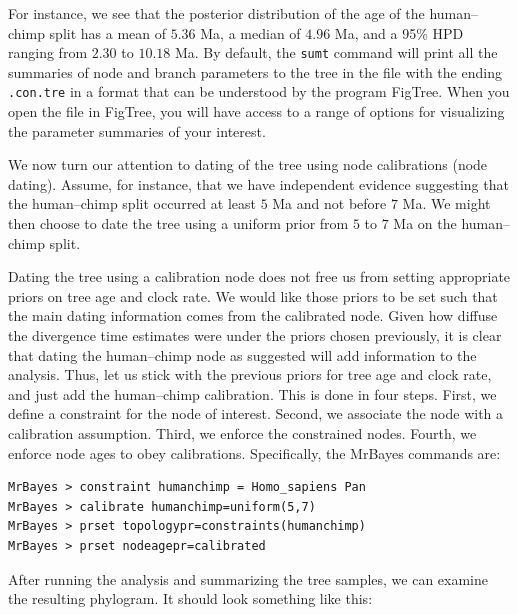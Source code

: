 \documentclass[12pt]{book}
\begin{document}
For instance, we see that the posterior distribution of the age of the human--chimp split has a
mean of $5.36$ Ma, a median of $4.96$ Ma, and a 95\% HPD ranging from $2.30$ to $10.18$ Ma. By
default, the \texttt{sumt} command will print all the summaries of node and branch parameters to
the tree in the file with the ending \texttt{.con.tre} in a format that can be understood by the
program FigTree.  When you open the file in FigTree, you will have access to a range of options for
visualizing the parameter summaries of your interest.

We now turn our attention to dating of the tree using node calibrations (node dating). Assume, for
instance, that we have independent evidence suggesting that the human--chimp split occurred at
least $5$ Ma and not before $7$ Ma. We might then choose to date the tree using a uniform prior
from $5$ to $7$ Ma on the human--chimp split.

Dating the tree using a calibration node does not free us from setting appropriate priors on tree
age and clock rate. We would like those priors to be set such that the main dating information
comes from the calibrated node. Given how diffuse the divergence time estimates were under the
priors chosen previously, it is clear that dating the human--chimp node as suggested will add
information to the analysis. Thus, let us stick with the previous priors for tree age and clock
rate, and just add the human--chimp calibration. This is done in four steps. First, we define a
constraint for the node of interest. Second, we associate the node with a calibration assumption.
Third, we enforce the constrained nodes. Fourth, we enforce node ages to obey calibrations.
Specifically, the MrBayes commands are:

\begin{Verbatim}
MrBayes > constraint humanchimp = Homo_sapiens Pan
MrBayes > calibrate humanchimp=uniform(5,7)
MrBayes > prset topologypr=constraints(humanchimp)
MrBayes > prset nodeagepr=calibrated
\end{Verbatim}

After running the analysis and summarizing the tree samples, we can examine the resulting
phylogram. It should look something like this:
\end{document}
